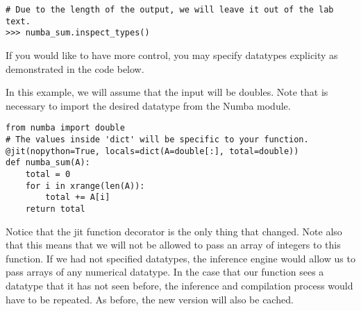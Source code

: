 \begin{lstlisting}
# Due to the length of the output, we will leave it out of the lab text.
>>> numba_sum.inspect_types()
\end{lstlisting}

If you would like to have more control, you may specify datatypes explicity as demonstrated in the code below.

In this example, we will assume that the input will be doubles.
Note that is necessary to import the desired datatype from the Numba module.

\begin{lstlisting}
from numba import double
# The values inside 'dict' will be specific to your function.
@jit(nopython=True, locals=dict(A=double[:], total=double))
def numba_sum(A):
    total = 0
    for i in xrange(len(A)):
        total += A[i]
    return total
\end{lstlisting}

Notice that the jit function decorator is the only thing that changed.
Note also that this means that we will not be allowed to pass an array of integers to this function.
If we had not specified datatypes, the inference engine would allow us to pass arrays of any numerical datatype.
In the case that our function sees a datatype that it has not seen before, the inference and compilation process would have to be repeated.
As before, the new version will also be cached.

